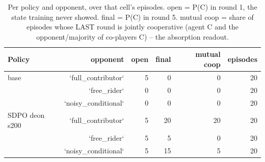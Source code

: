 \begin{table}[t]
\centering
\caption{Per policy and opponent, over that cell's episodes. open = P(C) in round 1, the state training never showed. final = P(C) in round 5. mutual coop = share of episodes whose LAST round is jointly cooperative (agent C and the opponent/majority of co-players C) -- the absorption readout.}
\label{tab:mr-outcomes}
\small
\setlength{\tabcolsep}{3.5pt}
\begin{tabular}{lrrrrr}
\toprule
Policy & opponent & open & final & mutual coop & episodes \\
\midrule
base & `full_contributor` & 5 & 0 & 0 & 20 \\
 & `free_rider` & 0 & 0 & 0 & 20 \\
 & `noisy_conditional` & 0 & 0 & 0 & 20 \\
SDPO deon s200 & `full_contributor` & 5 & 20 & 20 & 20 \\
 & `free_rider` & 5 & 5 & 0 & 20 \\
 & `noisy_conditional` & 5 & 15 & 5 & 20 \\
\bottomrule
\end{tabular}
\end{table}
